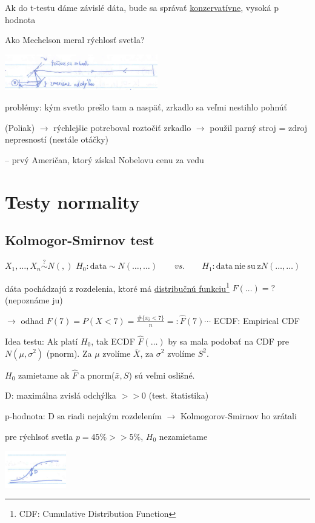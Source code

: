\documentclass[unknownkeysallowed]{article}
\begin{document}
Ak do t-testu dáme závislé dáta, bude sa správať \underline{konzervatívne}, vysoká p hodnota

\vspace{5mm}

Ako Mechelson meral rýchlosť svetla?

\includegraphics[width=0.5\textwidth]{imgs/obr19.png}

problémy: kým svetlo prešlo tam a naspäť, zrkadlo sa veľmi nestihlo pohnúť

(Poliak) $\to$ rýchlejšie potreboval roztočiť zrkadlo $\to$ použil parný stroj = zdroj nepresností (nestále otáčky)

-- prvý Američan, ktorý získal Nobelovu cenu za vedu

\section*{Testy normality}
\subsection*{Kolmogor-Smirnov test}
$X_1, \ldots, X_n \overset{?}{\sim} N(,)$ \qquad $H_0: \mathrm{data} \sim N(\ldots,\ldots) \qquad vs. \qquad H_1: \mathrm{data~nie~su~z} N(\ldots,\ldots)$

dáta pochádzajú z rozdelenia, ktoré má \underline{distribučnú funkciu}\footnote{CDF: Cumulative Distribution Function} $F(\ldots) = ?$ (nepoznáme ju)

$\to$ odhad $F(7) = P(X<7) = \frac{\#\{x_i < 7 \}}{n} =: \hat{F}(7) \cdots$ ECDF: Empirical CDF

Idea testu: Ak platí $H_0$, tak ECDF $\hat{F}(\ldots)$ by sa mala podobať na CDF pre $N(\mu, \sigma^2)$ (pnorm). Za $\mu$ zvolíme $\bar{X}$, za $\sigma^2$ zvolíme $S^2$.

\begin{multicols}{2}
$H_0$ zamietame ak $\hat{F}$ a pnorm($\bar{x}, S$) sú veľmi oslišné.

D: maximálna zvislá odchýlka $ >> 0$ (test. štatistika)

p-hodnota: D sa riadi nejakým rozdelením $\to$ Kolmogorov-Smirnov ho zrátali

pre rýchlsoť svetla $p=45\% >> 5\%$, $H_0$ nezamietame

\columnbreak

\includegraphics[width=0.2\textwidth]{imgs/obr20.png}

\end{multicols}
\end{document}
